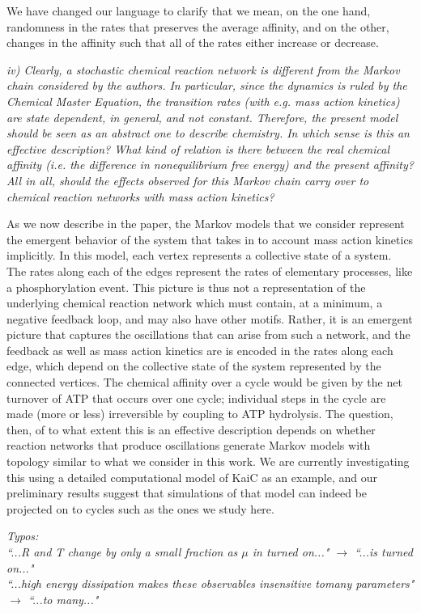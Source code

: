 \documentclass[amsmath, preprintnumbers, 12pt, onecolumn, pre, longbibliograpy]{revtex4-1}
\begin{document}
We have changed our language to clarify that we mean, on the one hand, randomness in the rates that preserves the average affinity, and on the other, changes in the affinity such that all of the rates either increase or decrease.


\textit{iv) Clearly, a stochastic chemical reaction network is different from the Markov chain considered by the authors. In particular, since the dynamics is ruled by the Chemical Master Equation, the transition rates (with e.g. mass action kinetics) are state dependent, in general, and not constant.
Therefore, the present model should be seen as an abstract one to describe chemistry. In which sense is this an effective description? What kind of relation is there between the real chemical affinity (i.e. the difference in nonequilibrium free energy) and the present affinity?
All in all, should the effects observed for this Markov chain carry over to chemical reaction networks with mass action kinetics?}

As we now describe in the paper, the Markov models that we consider represent the emergent behavior of the system that takes in to account mass action kinetics implicitly.  In this model, each vertex represents a collective state of a system. The rates along each of the edges represent the rates of elementary processes, like a phosphorylation event. This picture is thus not a representation of the underlying chemical reaction network which must contain, at a minimum, a negative feedback loop, and may also have other motifs. Rather, it is an emergent picture that captures the oscillations that can arise from such a network, and the feedback as well as mass action kinetics are is encoded in the rates along each edge, which depend on the collective state of the system represented by the connected vertices. The chemical affinity over a cycle would be given by the net turnover of ATP that occurs over one cycle; individual steps in the cycle are made (more or less) irreversible by coupling to ATP hydrolysis. The question, then, of to what extent this is an effective description depends on whether reaction networks that produce oscillations generate Markov models with topology similar to what we consider in this work. We are currently investigating this using a detailed computational model of KaiC as an example, and our preliminary results suggest that simulations of that model can indeed be projected on to cycles such as the ones we study here.

\textit{Typos: \\
``...R and T change by only a small fraction as $\mu$ in turned on..." $\to$ ``...is turned on..." \\
``...high energy dissipation makes these observables insensitive tomany parameters" $\to$ ``...to many..."}
\end{document}
